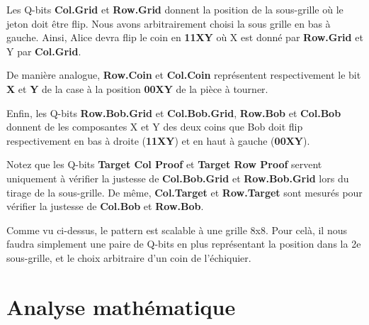 \documentclass[12pt]{article}
\begin{document}
    \vspace{5mm}

    Les Q-bits \textbf{Col.Grid} et \textbf{Row.Grid} donnent la position de la sous-grille où le jeton doit être flip. Nous avons arbitrairement choisi la sous grille en bas à gauche. Ainsi, Alice devra flip le coin en \textbf{11XY} où X est donné par \textbf{Row.Grid} et Y par \textbf{Col.Grid}.

    \vspace{5mm}

    De manière analogue, \textbf{Row.Coin} et \textbf{Col.Coin} représentent respectivement le bit \textbf{X} et \textbf{Y} de la case à la position \textbf{00XY} de la pièce à tourner.

    \vspace{5mm}

    Enfin, les Q-bits \textbf{Row.Bob.Grid} et \textbf{Col.Bob.Grid}, \textbf{Row.Bob} et \textbf{Col.Bob} donnent de les composantes X et Y des deux coins que Bob doit flip respectivement en bas à droite (\textbf{11XY}) et en haut à gauche (\textbf{00XY}).

    \vspace{5mm}
    Notez que les Q-bits \textbf{Target Col Proof} et \textbf{Target Row Proof} servent uniquement à vérifier la justesse de \textbf{Col.Bob.Grid} et \textbf{Row.Bob.Grid} lors du tirage de la sous-grille.
    De même, \textbf{Col.Target} et \textbf{Row.Target} sont mesurés pour vérifier la justesse de \textbf{Col.Bob} et \textbf{Row.Bob}.

    \vspace{10mm}
    Comme vu ci-dessus, le pattern est scalable à une grille 8x8. Pour celà, il nous faudra simplement une paire de Q-bits en plus représentant la position dans la 2e sous-grille, et le choix arbitraire d'un coin de l'échiquier.

    \section{Analyse mathématique}
\end{document}
